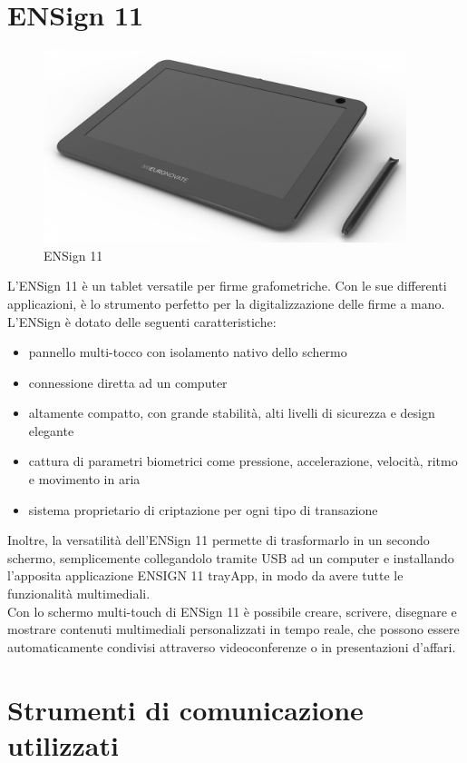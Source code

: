 \section{ENSign 11}

\begin{figure}[!h] 
    \centering 
    \includegraphics[width=300pt]{images/ensign11.png} 
    \caption{ENSign 11}
    \label{fig:ens11}
\end{figure}

L'ENSign 11 è un tablet versatile per firme grafometriche. Con le sue differenti applicazioni, è lo strumento perfetto per la digitalizzazione delle firme a mano.\\
L'ENSign è dotato delle seguenti caratteristiche:
\begin{itemize}
    \item pannello multi-tocco con isolamento nativo dello schermo
    \item connessione diretta ad un computer
    \item altamente compatto, con grande stabilità, alti livelli di sicurezza e design elegante
    \item cattura di parametri biometrici come pressione, accelerazione, velocità, ritmo e movimento in aria
    \item sistema proprietario di criptazione per ogni tipo di transazione
\end{itemize}
Inoltre, la versatilità dell'ENSign 11 permette di trasformarlo in un secondo schermo, semplicemente collegandolo tramite USB ad un computer e installando l'apposita applicazione ENSIGN 11 trayApp, in modo da avere tutte le funzionalità multimediali.\\
Con lo schermo multi-touch di ENSign 11 è possibile creare, scrivere, disegnare e mostrare contenuti multimediali personalizzati in tempo reale, che possono essere automaticamente condivisi attraverso videoconferenze o in presentazioni d'affari.

\section{Strumenti di comunicazione utilizzati}

